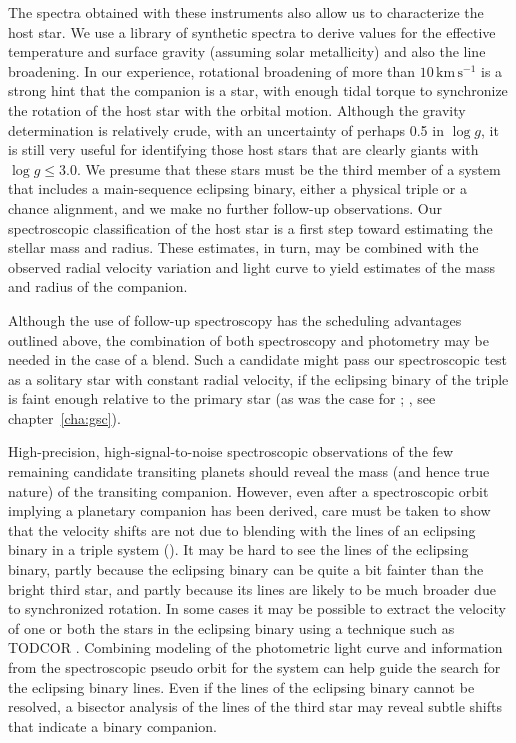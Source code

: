 The spectra obtained with these instruments also allow us to characterize the host star. We use a library of synthetic spectra to derive values for the effective temperature and surface gravity (assuming solar metallicity) and also the line broadening.  In our experience, rotational broadening of more than $10\,\mathrm{km\,s^{-1}}$ is a strong hint that the companion is a star, with enough tidal torque to synchronize the rotation of the host star with the orbital motion. Although the gravity determination is relatively crude, with an uncertainty of perhaps 0.5 in $\log{g}$, it is still very useful for identifying those host stars that are clearly giants with $\log{g} \leq 3.0$.  We presume that these stars must be the third member of a system that includes a main-sequence eclipsing binary, either a physical triple or a chance alignment, and we make no further follow-up observations. Our spectroscopic classification of the host star is a first step toward estimating the stellar mass and radius. These estimates, in turn, may be combined with the observed radial velocity variation and light curve to yield estimates of the mass and radius of the companion.

Although the use of follow-up spectroscopy has the scheduling advantages outlined above, the combination of both spectroscopy and photometry may be needed in the case of a blend. Such a candidate might pass our spectroscopic test as a solitary star with constant radial velocity, if the eclipsing binary of the triple is faint enough relative to the primary star (as was the case for \gscOTE; \citealt{ODonovan_Charbonneau_Torres:apj:2006a}, see chapter~\ref{cha:gsc}).

High-precision, high-signal-to-noise spectroscopic observations of the few remaining candidate transiting planets should reveal the mass (and hence true nature) of the transiting companion. However, even after a spectroscopic orbit implying a planetary companion has been derived, care must be taken to show that the velocity shifts are not due to blending with the lines of an eclipsing binary in a triple system (\citealp[e.g.,][]{Mandushev_Torres_Latham:apj:2005a}). It may be hard to see the lines of the eclipsing binary, partly because the eclipsing binary can be quite a bit fainter than the bright third star, and partly because its lines are likely to be much broader due to synchronized rotation.  In some cases it may be possible to extract the velocity of one or both the stars in the eclipsing binary using a technique such as TODCOR \citep{Mandushev_Torres_Latham:apj:2005a}. Combining modeling of the photometric light curve and information from the spectroscopic pseudo orbit for the system can help guide the search for the eclipsing binary lines.  Even if the lines of the eclipsing binary cannot be resolved, a bisector analysis of the lines of the third star may reveal subtle shifts that indicate a binary companion.

